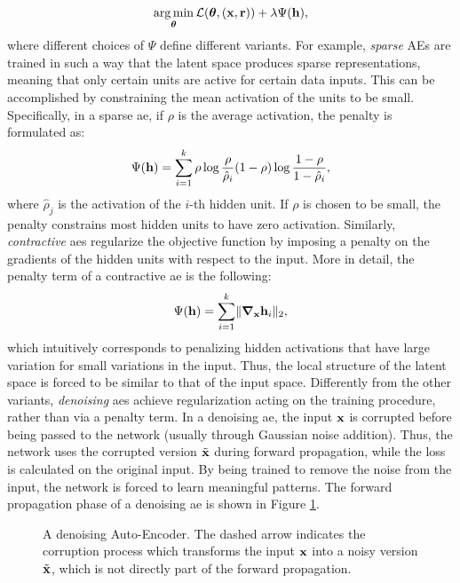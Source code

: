 $$\argmin_{\Param} \Loss(\Param, (\Vector{x}, \Vector{r})) + \lambda \Psi(\Vector{h}),$$
where different choices of $\Psi$ define different variants. For example, \emph{sparse} AEs  
are trained in such a way that the latent space produces sparse representations, meaning that only certain units are active for certain data inputs. This can be accomplished by constraining the mean activation of the units to be small. Specifically, in a sparse \gls{ae}, if $\rho$ is the average activation, the penalty is formulated as:
$$\Psi(\Vector{h}) = \sum_{i=1}^k \rho \log \frac{\rho}{\hat{\rho}_i} (1 - \rho) \log \frac{1-\rho}{1-\hat{\rho}_i},$$
where $\hat{\rho}_j$ is the activation of the $i$-th hidden unit. If $\rho$ is chosen to be small, the penalty constrains most hidden units to have zero activation.
Similarly, \emph{contractive} \glspl{ae} regularize the objective function by imposing a penalty on the gradients of the hidden units with respect to the input. More in detail, the penalty term of a contractive \gls{ae} is the following:
$$\Psi(\Vector{h}) = \sum_{i=1}^k\norm{\grad_{\Vector{x}}\Vector{h}_i}_2,$$
which intuitively corresponds to penalizing hidden activations that have large variation for small variations in the input. Thus, the local structure of the latent space is forced to be similar to that of the input space. Differently from the other variants, \emph{denoising} \glspl{ae} achieve regularization acting on the training procedure, rather than via a penalty term. In a denoising \gls{ae}, the input $\Vector{x}$ is corrupted before being passed to the network (usually through Gaussian noise addition). Thus, the network uses the corrupted version $\tilde{\Vector{x}}$ during forward propagation, while the loss is calculated on the original input. By being trained to remove the noise from the input, the network is forced to learn meaningful patterns. The forward propagation phase of a denoising \gls{ae} is shown in Figure \ref{fig:denoising-ae}.
\begin{figure*}[h!]
    \centering
    \resizebox{.6\textwidth}{!}{}
    \caption{A denoising Auto-Encoder. The dashed arrow indicates the corruption process which transforms the input $\Vector{x}$ into a noisy version $\tilde{\Vector{x}}$, which is not directly part of the forward propagation.}
    \label{fig:denoising-ae}
\end{figure*}

